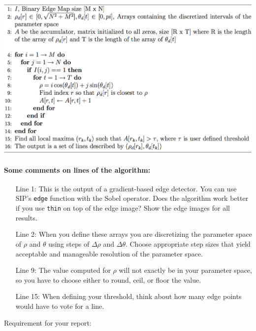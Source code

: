 \documentclass[a4paper]{article}
\begin{document}
\includegraphics[width=1\linewidth]{figs/alg-hough-lines.png}%

\paragraph{Some comments on lines of the algorithm:}
\begin{itemize}
\item[Line 1:] This is the output of a gradient-based edge
detector. You can use SIP's \texttt{edge} function with the Sobel operator. Does
the algorithm work better if you use \texttt{thin} on top of the edge image?
Show the edge images for all results.
\item[Line 2:] When you define these arrays you are discretizing the parameter
space of $\rho$ and $\theta$ using steps of $\Delta \rho$ and $\Delta
\theta$. Choose appropriate step sizes that yield acceptable and manageable
resolution of the parameter space.
\item[Line 9:] The value computed for $\rho$ will not exactly be in your
parameter space, so you have to choose either to round, ceil, or floor the value.
\item[Line 15:] When defining your threshold, think about how many edge points would
have to vote for a line.
\end{itemize}
Requirement for your report:
\end{document}

